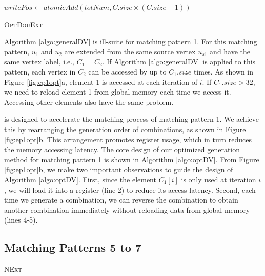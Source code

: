 \begin{algorithm}[t]
	$writePos \leftarrow atomicAdd(totNum,C.size \times (C.size-1))$\;
	\caption{\textsc{OptDouExt}}
	\label{algo:optDV}
\end{algorithm}
Algorithm \ref{algo:generalDV} is ill-suite for matching pattern 1. For this matching pattern, $u_1$ and $u_2$ are extended from the same
source vertex $u_{s1}$ and have the same vertex label, i.e., $C_1 = C_2$. If Algorithm \ref{algo:generalDV} is applied to this pattern,
each vertex in $C_2$ can be accessed by up to $C_1.size$ times. As shown in Figure \ref{fig:ep1opt}a, element 1 is accessed
at each iteration of $i$. If $C_1.size>32$, we need to reload element 1 from global memory each time we access it. Accessing other elements
also have the same problem.

\SystemName is designed to accelerate the matching process of matching pattern 1. We achieve this by rearranging the generation order of
combinations, as shown in Figure \ref{fig:ep1opt}b. This arrangement promotes register usage, which in turn reduces the memory
accessing latency. The core design of our optimized generation method for matching pattern 1 is shown in Algorithm \ref{algo:optDV}. From
Figure \ref{fig:ep1opt}b, we make two important observations to guide the design of Algorithm \ref{algo:optDV}. First, since the
element $C_1[i]$ is only used at iteration $i$, we will load it into a register (line 2) to reduce its access latency. Second, each time we
generate a combination, we can reverse the combination to obtain another combination immediately without reloading data from global memory
(lines 4-5).



\subsection{Matching Patterns 5 to 7}
\begin{algorithm}[t!]
	\caption{\textsc{NExt}}
	\label{algo:nvext}
\end{algorithm}

